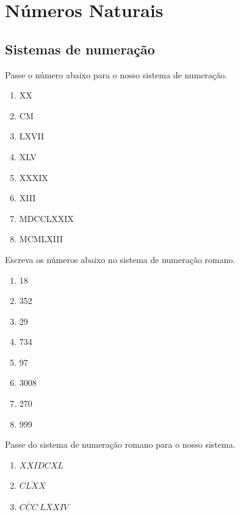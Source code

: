 \chapter{Números Naturais}
\section{Sistemas de numeração}

\item Passe o número abaixo para o nosso sistema de numeração.
		\begin{multicols}{4}		
		\begin{enumerate}
			\item XX
			\item CM
			\item LXVII
			\item XLV
			\item XXXIX
			\item XIII
			\item MDCCLXXIX
			\item MCMLXIII
		\end{enumerate}
		\end{multicols}
		
		\item Escreva os números abaixo no sistema de numeração romano.
			\begin{multicols}{4}		
			\begin{enumerate}
				\item 18
				\item 352
				\item 29
				\item 734
				\item 97
				\item 3008
				\item 270
				\item 999
			\end{enumerate}
			\end{multicols}
			
		\item Passe do sistema de numeração romano para o nosso sistema.
		\begin{multicols}{3}		
		\begin{enumerate}
			\item $\overline{XXI}DCXL$
			\item $\overline{CLXX}$
			\item $\overline{\overline{CCC}}\ \overline{LXX}IV$
		\end{enumerate}
		\end{multicols}
		
